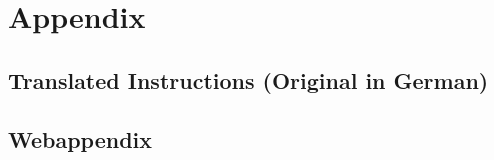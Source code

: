 \documentclass[a4paper,12pt]{article}
\begin{document}
\section*{Appendix}
\subsection*{Translated Instructions (Original in German)} \label{instructions}
 
%
%
%
\clearpage
\subsection*{Webappendix} \label{instructions}

\end{document}
